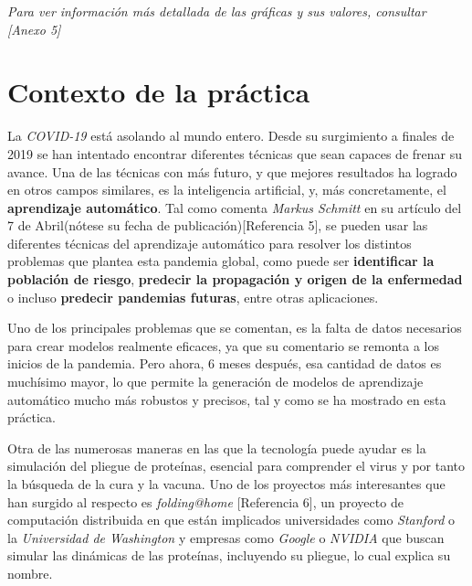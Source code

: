 \documentclass[12pt,a4paper, xcolor=table]{article}
\begin{document}
            \vspace{2mm}

            \textit{Para ver información más detallada de las gráficas y sus valores, consultar [Anexo 5]}

        \newpage

    \section{Contexto de la práctica}

      La \textit{COVID-19} está asolando al mundo entero. Desde su surgimiento a finales de 2019 se han intentado encontrar diferentes técnicas que sean capaces de frenar su avance. Una de las técnicas con más futuro, y que mejores resultados ha logrado en otros campos similares, es la inteligencia artificial, y, más concretamente, el \textbf{aprendizaje automático}. Tal como comenta \textit{Markus Schmitt} en su artículo del 7 de Abril(nótese su fecha de publicación)[Referencia 5], se pueden usar las diferentes técnicas del aprendizaje automático para resolver los distintos problemas que plantea esta pandemia global, como puede ser \textbf{identificar la población de riesgo}, \textbf{predecir la propagación y origen de la enfermedad} o incluso \textbf{predecir pandemias futuras}, entre otras aplicaciones.

      \vspace{1mm}

      Uno de los principales problemas que se comentan, es la falta de datos necesarios para crear modelos realmente eficaces, ya que su comentario se remonta a los inicios de la pandemia. Pero ahora, 6 meses después, esa cantidad de datos es muchísimo mayor, lo que permite la generación de modelos de aprendizaje automático mucho más robustos y precisos, tal y como se ha mostrado en esta práctica.

      \vspace{4mm}

      Otra de las numerosas maneras en las que la tecnología puede ayudar es la simulación del pliegue de proteínas, esencial para comprender el virus y por tanto la búsqueda de la cura y la vacuna. Uno de los proyectos más interesantes que han surgido al respecto es \textit{folding@home} [Referencia 6], un proyecto de computación distribuida en que están implicados universidades como \textit{Stanford} o la \textit{Universidad de Washington} y empresas como \textit{Google} o \textit{NVIDIA} que buscan simular las dinámicas de las proteínas, incluyendo su pliegue, lo cual explica su nombre.
\end{document}
